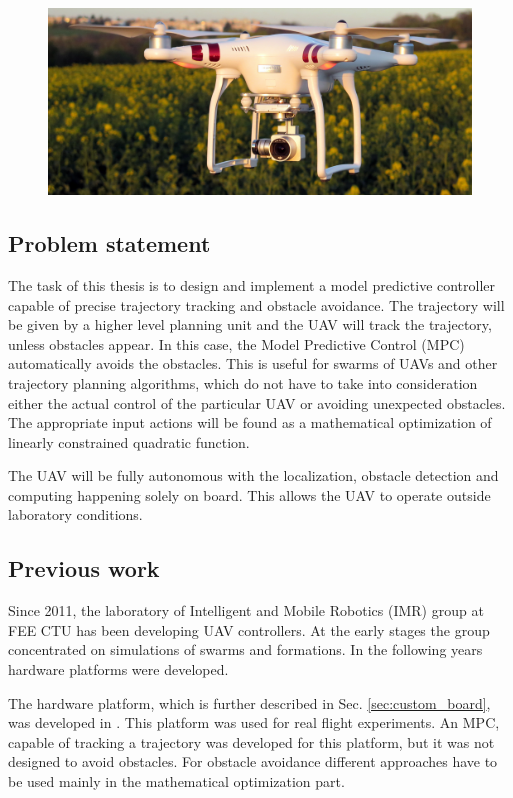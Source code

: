 \documentclass[a4paper,11pt,titlepage]{article}
\begin{document}
\begin{figure}[h]
\centering
\includegraphics[width=1\linewidth]{fig/phantom.jpg}
\label{fig:phantom}
\end{figure}

\subsection{Problem statement}
The task of this thesis is to design and implement a model predictive controller capable of precise trajectory tracking and obstacle avoidance. The trajectory will be given by a higher level planning unit and the UAV will track the trajectory, unless obstacles appear. In this case, the Model Predictive Control (MPC) automatically avoids the obstacles. This is useful for swarms of UAVs and other trajectory planning algorithms, which do not have to take into consideration either the actual control of the particular UAV or avoiding unexpected obstacles. The appropriate input actions will be found as a mathematical optimization of linearly constrained quadratic function. 

The UAV will be fully autonomous with the localization, obstacle detection and computing happening solely on board. This allows the UAV to operate outside laboratory conditions. 

\subsection{Previous work}
Since 2011, the laboratory of Intelligent and Mobile Robotics (IMR) group at FEE CTU has been developing UAV controllers. At the early stages the group concentrated on simulations of swarms and formations. In the following years hardware platforms were developed. 

The hardware platform, which is further described in Sec. \ref{sec:custom_board}, was developed in \cite{tomas}. This platform was used for real flight experiments. An MPC, capable of tracking a trajectory was developed for this platform, but it was not designed to avoid obstacles. For obstacle avoidance different approaches have to be used mainly in the mathematical optimization part.
\end{document}
